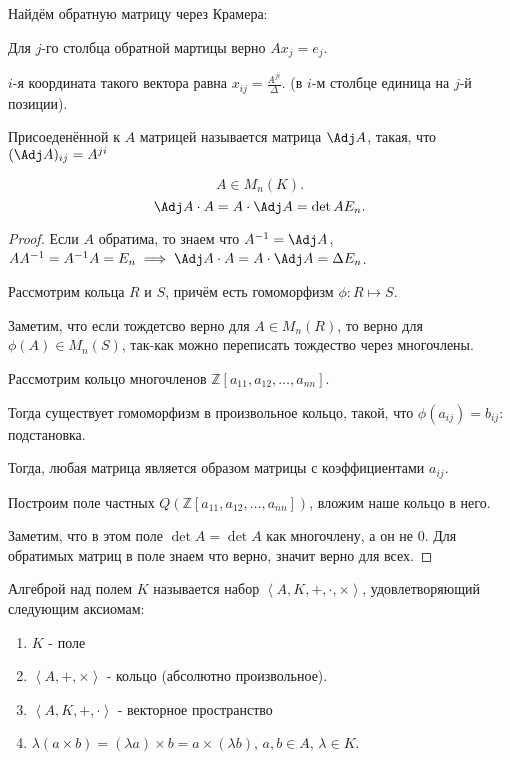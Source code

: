 \begin{example} \thmslashn

    Найдём обратную матрицу через Крамера:

    Для $j$-го столбца обратной мартицы верно $Ax_{j}=e_{j}$.

    $i$-я координата такого вектора равна $x_{ij} = \frac{A^{ji}}{\Delta}$. (в $i$-м столбце единица на $j$-й позиции).
\end{example}
\begin{definition} \thmslashn 

    Присоеденённой к $A$ матрицей называется матрица $\Adj A$, такая, что $(\Adj A)_{ij} = A^{ji}$
\end{definition}
\begin{theorem} \thmslashn

    \[ A\in M_{n}(K) .\]
    \[ \Adj A \cdot A = A \cdot \Adj A = \det A E_{n} .\]
    \begin{proof} \thmslashn
    
        Если $A$ обратима, то знаем что $A^{-1} = \Adj A$, $A A^{-1} = A^{-1}A = E_{n} \implies \Adj A \cdot A = A \cdot \Adj A = \Delta E_{n}$.

        Рассмотрим кольца $R$ и $S$, причём есть гомоморфизм $\phi : R \mapsto S$. 

        Заметим, что если тождетсво верно для $A\in M_{n}(R)$, то верно для $\phi(A)\in M_{n}(S)$, так-как можно переписать тождество через многочлены.

        Рассмотрим кольцо многочленов $\mathbb{Z}[a_{11}, a_{12}, \ldots, a_{nn}]$.

        Тогда существует гомоморфизм в произвольное кольцо, такой, что $\phi(a_{ij}) = b_{ij}$: подстановка.

        Тогда, любая матрица является образом матрицы с коэффициентами $a_{ij}$.

        Построим поле частных $Q(\mathbb{Z}[a_{11}, a_{12}, \ldots, a_{nn}])$, вложим наше кольцо в него. 

        Заметим, что в этом поле $\det A = \det A$ как многочлену, а он не $0$. Для обратимых матриц в поле знаем что верно, значит верно для всех.
    \end{proof}
\end{theorem}
\begin{definition}[Алгебра] \thmslashn 

    Алгеброй над полем $K$ называется набор $\left<A, K, +, \cdot, \times\right>$, удовлетворяющий следующим аксиомам:
    \begin{enumerate}
        \item $K$ - поле
        \item $\left<A, +, \times\right>$ - кольцо (абсолютно произвольное).
        \item $\left<A, K, +, \cdot\right>$ - векторное пространство
        \item $\lambda(a \times b) = (\lambda a) \times b = a \times (\lambda b)$, $a, b\in A$, $\lambda\in K$.
    \end{enumerate}
\end{definition}
